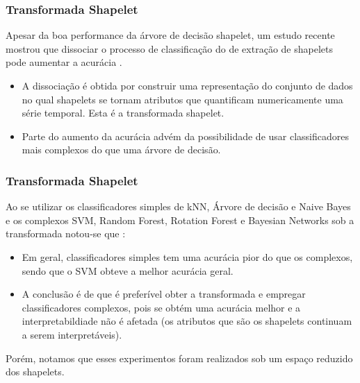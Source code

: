 \documentclass{beamer}
\begin{document}
\begin{frame}
\frametitle{Transformada Shapelet}

Apesar da boa performance da {\'a}rvore de decis{\~a}o shapelet, um estudo recente mostrou que dissociar o processo de classifica{\c c}{\~a}o do de extra{\c c}{\~a}o de shapelets pode aumentar a acur{\'a}cia \cite{Hills:2013dk}.

\begin{itemize}
\item A dissocia{\c c}{\~a}o {\'e} obtida por construir uma representa{\c c}{\~a}o do conjunto de dados no qual shapelets se tornam atributos que quantificam numericamente uma s{\'e}rie temporal. Esta {\'e} a transformada shapelet.

\item Parte do aumento da acur{\'a}cia adv{\'e}m da possibilidade de usar classificadores mais complexos do que uma {\'a}rvore de decis{\~a}o.
\end{itemize}
\end{frame}


\begin{frame}
\frametitle{Transformada Shapelet}

Ao se utilizar os classificadores simples de kNN, {\'A}rvore de decis{\~a}o e Naive Bayes e os complexos SVM, Random Forest, Rotation Forest e Bayesian Networks sob a transformada notou-se que \cite{Hills:2013dk}:

\begin{itemize}
\item Em geral, classificadores simples tem uma acur{\'a}cia pior do que os complexos, sendo que o SVM obteve a melhor acur{\'a}cia geral.
\item A conclus{\~a}o {\'e} de que {\'e} prefer{\'i}vel obter a transformada e empregar classificadores complexos, pois se obt{\'e}m uma acur{\'a}cia melhor e a interpretabildiade n{\~a}o {\'e} afetada (os atributos que s{\~a}o os shapelets continuam a serem interpret{\'a}veis).
\end{itemize}

Por{\'e}m, notamos que esses experimentos foram realizados sob um espa{\c c}o reduzido dos shapelets.
\end{frame}

\end{document}

